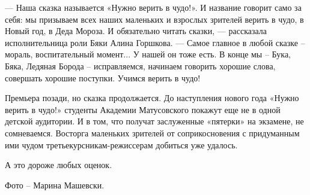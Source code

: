 
— Наша сказка называется «Нужно верить в чудо!». И название говорит само за
себя: мы призываем всех наших маленьких и взрослых зрителей верить в чудо, в
Новый год, в Деда Мороза. И обязательно читать сказки, — рассказала
исполнительница роли Бяки Алина Горшкова. — Самое главное в любой сказке –
мораль, воспитательный момент... У нашей он тоже есть. В конце мы – Бука, Бяка,
Ледяная Борода – исправляемся, начинаем говорить хорошие слова, совершать
хорошие поступки. Учимся верить в чудо!


Премьера позади, но сказка продолжается. До наступления нового года «Нужно
верить в чудо!» студенты Академии Матусовского покажут еще не в одной детской
аудитории. И в том, что получат заслуженные «пятерки» на экзамене, не
сомневаемся. Восторга маленьких зрителей от соприкосновения с придуманным ими
чудом третьекурсникам-режиссерам добиться уже удалось.

А это дороже любых оценок.

Фото – Марина Машевски.

